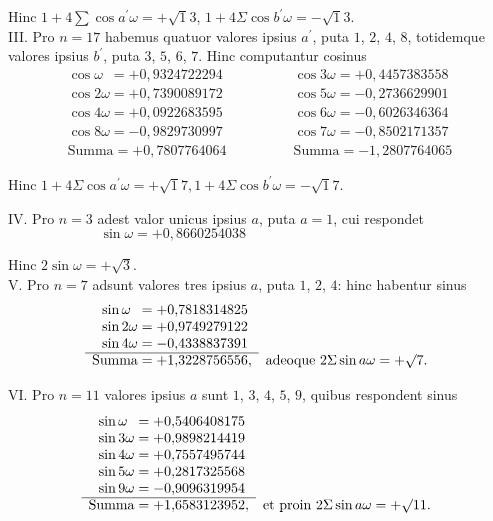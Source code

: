 \documentclass[twoside,12pt, showframe]{memoir}
\begin{document}
Hinc \(1+4 \sum \cos a^{\prime} \omega=+\surd 13\), \(1+4 \Sigma \cos b^{\prime} \omega=-\surd 13\).\\

III. Pro \(n=17\) habemus quatuor valores ipsius \(a^{\prime}\), puta \(1\), \(2\), \(4\), \(8\), totidemque valores ipsius \(b^{\prime}\), puta \(3\), \(5\), \(6\), \(7\). Hinc computantur cosinus
\[\begin{array}{r}
\cos \omega\phantom{1}  =+0{,}9324722294 \\
\cos 2 \omega  =+0{,}7390089172 \\
\cos 4 \omega  =+0{,}0922683595 \\
\cos 8 \omega  =-0{,}9829730997 \\
\hline \text{Summa} =+0{,}7807764064 
\end{array}
\qquad \qquad
\begin{array}{r}
\cos 3 \omega  =+0{,}4457383558 \\
\cos 5 \omega  =-0{,}2736629901 \\
\cos 6 \omega  =-0{,}6026346364 \\
\cos 7 \omega  =-0{,}8502171357 \\
\hline \text{Summa} =-1{,}2807764065
\end{array}\]
 
Hinc \(1+4 \Sigma \cos a^{\prime} \omega=+\surd 17,1+4 \Sigma \cos b^{\prime} \omega=-\surd 17\).\\\clearpage\noindent%

IV. Pro \(n=3\) adest valor unicus ipsius \(a\), puta \(a=1\), cui respondet 
\[\sin \omega=+0{,}8660254038 \quad\quad \phantom{\sin \omega=+0{,}8660254038}\]
 
Hinc \(2 \sin \omega=+\surd 3\).\\

V. Pro \(n=7\) adsunt valores tres ipsius \(a\), puta \(1\), \(2\), \(4\): hinc habentur sinus
\[\begin{array}{rl}
 \sin \omega\phantom{1} =+0{,}7818314825 \phantom{,}&\\
\sin 2 \omega  =+0{,}9749279122 \phantom{,}&\\
\sin 4 \omega  =-0{,}4338837391 \phantom{,}&\\
\cline{1-1} \text{Summa}  =+1{,}3228756556,& \text{adeoque } 2 \Sigma \sin a \omega=+\surd 7.
\end{array}\]

VI. Pro \(n=11\) valores ipsius \(a\) sunt \(1\), \(3\), \(4\), \(5\), \(9\), quibus respondent sinus
\[\begin{array}{rl}
\sin \omega\phantom{1}  =+0{,}5406408175 \phantom{,}&\\
\sin 3 \omega  =+0{,}9898214419 \phantom{,}&\\
\sin 4 \omega  =+0{,}7557495744 \phantom{,}&\\
\sin 5 \omega  =+0{,}2817325568 \phantom{,}&\\
\sin 9 \omega  =-0{,}9096319954 \phantom{,}&\\
\cline{1-1} \text{Summa} =+1{,}6583123952,& \text{et proin } 2 \Sigma \sin a \omega=+\surd 11.
\end{array}\]
\end{document}
